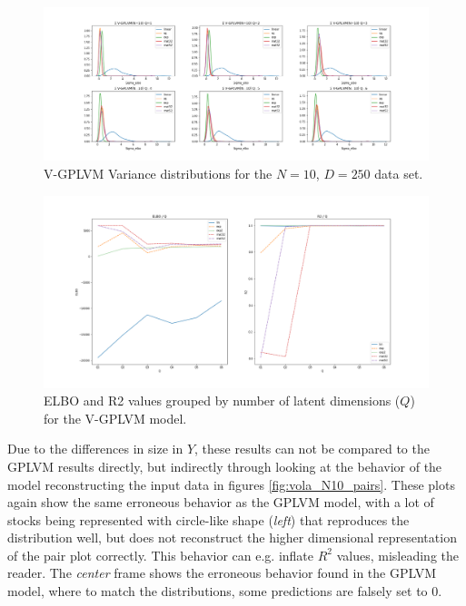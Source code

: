 \begin{figure}[b]%
	\centering
	\includegraphics[width=7in]{img/07_2/Sigma_VOLA_elbo.png}
	\caption[V-GPLVM Variance distributions]{V-GPLVM Variance distributions for the $N=10$, $D=250$ data set.}
	\label{fig:vola_variances}
\end{figure}
\begin{figure}[t]
	\centering
	\includegraphics[width=7in]{img/07_2/modelVOLA_Qs.png}
	\caption[V-GPLVM ELBO and $R^2$ model results]{ELBO and R2 values grouped by number of latent dimensions ($Q$) for the V-GPLVM model.}
	\label{fig:vola_ELBO_R2}
\end{figure}
Due to the differences in size in $Y$, these results can not be compared to the GPLVM results directly, but indirectly through looking at the behavior of the model reconstructing the input data in figures \ref{fig:vola_N10_pairs}. These plots again show the same erroneous behavior as the GPLVM model, with a lot of stocks being represented with circle-like shape (\textit{left}) that reproduces the distribution well, but does not reconstruct the higher dimensional representation of the pair plot correctly. This behavior can e.g. inflate $R^2$ values, misleading the reader. The \textit{center} frame shows the erroneous behavior found in the GPLVM model, where to match the distributions, some predictions are falsely set to 0. 
